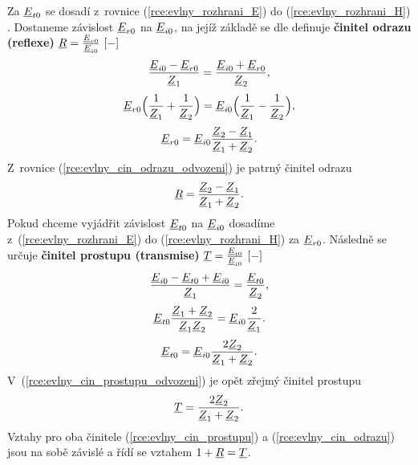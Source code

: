 Za ${\underline{E}}_{t0}$ se dosadí z~rovnice (\ref{rce:evlny_rozhrani_E}) do (\ref{rce:evlny_rozhrani_H}) . Dostaneme závislost ${\underline{E}}_{r0}$ na ${\underline{E}}_{i0}$, na jejíž základě se dle \cite{emp} definuje {\bf činitel odrazu (reflexe)}  ${\underline{R}} = \frac{{\underline{E}}_{r0}}{{\underline{E}}_{i0}}\mathrm{\ [-]}$
\begin{displaymath}
	\frac{{\underline{E}}_{i0}-{\underline{E}}_{r0}}{{\underline{Z}}_{1}} = \frac{{\underline{E}}_{i0} + {\underline{E}}_{r0}}{{\underline{Z}}_{2}},
\end{displaymath}
\begin{displaymath}
	{\underline{E}}_{r0}\Big( \frac{1}{{\underline{Z}}_{1}} + \frac{1}{{\underline{Z}}_{2}} \Big) = {\underline{E}}_{i0}\Big( \frac{1}{{\underline{Z}}_{1}} - \frac{1}{{\underline{Z}}_{2}} \Big),
\end{displaymath}
\begin{equation}
	{\underline{E}}_{r0} = {\underline{E}}_{i0} \frac{{\underline{Z}}_{2}-{\underline{Z}}_{1}}{{\underline{Z}}_{1}+{\underline{Z}}_{2}}.
	\label{rce:evlny_cin_odrazu_odvozeni}
\end{equation}
Z~rovnice (\ref{rce:evlny_cin_odrazu_odvozeni}) je patrný činitel odrazu
\begin{equation}
	{\underline{R}} = \frac{{\underline{Z}}_{2}-{\underline{Z}}_{1}}{{\underline{Z}}_{1}+{\underline{Z}}_{2}}.
	\label{rce:evlny_cin_odrazu}
\end{equation}
 Pokud chceme vyjádřit závislost ${\underline{E}}_{t0}$ na ${\underline{E}}_{i0}$ dosadíme z~(\ref{rce:evlny_rozhrani_E}) do (\ref{rce:evlny_rozhrani_H}) za ${\underline{E}}_{r0}$. Následně se určuje {\bf činitel prostupu (transmise)}  ${\underline{T}} = \frac{{\underline{E}}_{t0}}{{\underline{E}}_{i0}}\mathrm{\ [-]}$ 
\begin{displaymath}
	\frac{{\underline{E}}_{i0}-{\underline{E}}_{t0}+{\underline{E}}_{i0}}{{\underline{Z}}_{1}} = \frac{{\underline{E}}_{t0}}{{\underline{Z}}_{2}},
\end{displaymath}
\begin{displaymath}
	{\underline{E}}_{t0} \frac{{\underline{Z}}_{1}+{\underline{Z}}_{2}}{{\underline{Z}}_{1}{\underline{Z}}_{2}} = {\underline{E}}_{i0} \frac{2}{{\underline{Z}}_{1}}.
\end{displaymath}
\begin{equation}
	{\underline{E}}_{t0} = {\underline{E}}_{i0} \frac{2{\underline{Z}}_{2}}{{\underline{Z}}_{1}+{\underline{Z}}_{2}}.
	\label{rce:evlny_cin_prostupu_odvozeni}
\end{equation}
V~(\ref{rce:evlny_cin_prostupu_odvozeni}) je opět zřejmý činitel prostupu
\begin{equation}
	{\underline{T}} = \frac{2{\underline{Z}}_{2}}{{\underline{Z}}_{1}+{\underline{Z}}_{2}}.
	\label{rce:evlny_cin_prostupu}
\end{equation}
Vztahy pro oba činitele (\ref{rce:evlny_cin_prostupu}) a (\ref{rce:evlny_cin_odrazu}) jsou na sobě závislé a řídí se vztahem $1 + {\underline{R}} = {\underline{T}}$.

